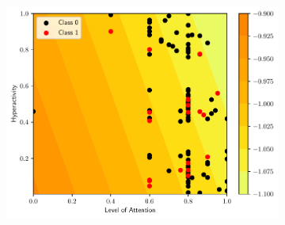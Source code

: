 \documentclass[conference]{IEEEtran}
\theoremstyle{definition}
\theoremstyle{remark}
\theoremstyle{remark}
\begin{document}
\begin{figure}
\begin{subfigure}[b]{0.32\textwidth}
        \caption{}
    \end{subfigure}
    \begin{subfigure}[b]{0.32\textwidth}
        \centering
        \includegraphics[width=\textwidth]{figs/svm-linear-contour-0-5.pdf}
        \caption{}
    \end{subfigure}


\end{figure}
\end{document}
